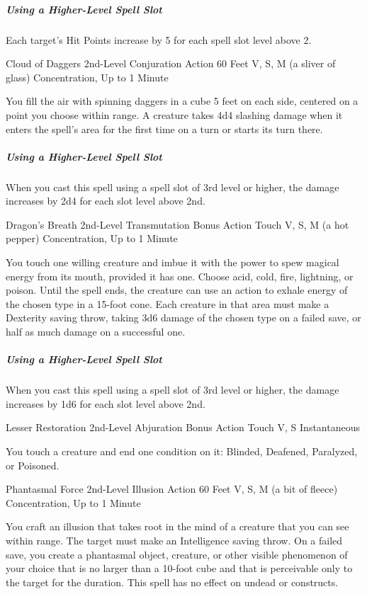\documentclass[letterpaper,openany,oneside,twocolumn]{book}
\begin{document}
\subparagraph*{Using a Higher-Level Spell Slot} Each target's Hit Points increase by 5 for each spell slot level above 2.

\DndSpellHeader
  {Cloud of Daggers}
  {2nd-Level Conjuration}
  {Action}
  {60 Feet}
  {V, S, M (a sliver of glass)}
  {Concentration, Up to 1 Minute}

You fill the air with spinning daggers in a cube 5 feet on each side, centered on a point you choose within range. A creature takes 4d4 slashing damage when it enters the spell's area for the first time on a turn or starts its turn there.

\subparagraph*{Using a Higher-Level Spell Slot} When you cast this spell using a spell slot of 3rd level or higher, the damage increases by 2d4 for each slot level above 2nd.

\DndSpellHeader
  {Dragon's Breath}
  {2nd-Level Transmutation}
  {Bonus Action}
  {Touch}
  {V, S, M (a hot pepper)}
  {Concentration, Up to 1 Minute}

You touch one willing creature and imbue it with the power to spew magical energy from its mouth, provided it has one. Choose acid, cold, fire, lightning, or poison. Until the spell ends, the creature can use an action to exhale energy of the chosen type in a 15-foot cone. Each creature in that area must make a Dexterity saving throw, taking 3d6 damage of the chosen type on a failed save, or half as much damage on a successful one.

\subparagraph*{Using a Higher-Level Spell Slot} When you cast this spell using a spell slot of 3rd level or higher, the damage increases by 1d6 for each slot level above 2nd.

\DndSpellHeader
  {Lesser Restoration}
  {2nd-Level Abjuration}
  {Bonus Action}
  {Touch}
  {V, S}
  {Instantaneous}

You touch a creature and end one condition on it: Blinded, Deafened, Paralyzed, or Poisoned.

\DndSpellHeader
  {Phantasmal Force}
  {2nd-Level Illusion}
  {Action}
  {60 Feet}
  {V, S, M (a bit of fleece)}
  {Concentration, Up to 1 Minute}

You craft an illusion that takes root in the mind of a creature that you can see within range. The target must make an Intelligence saving throw. On a failed save, you create a phantasmal object, creature, or other visible phenomenon of your choice that is no larger than a 10-foot cube and that is perceivable only to the target for the duration. This spell has no effect on undead or constructs.
\end{document}
